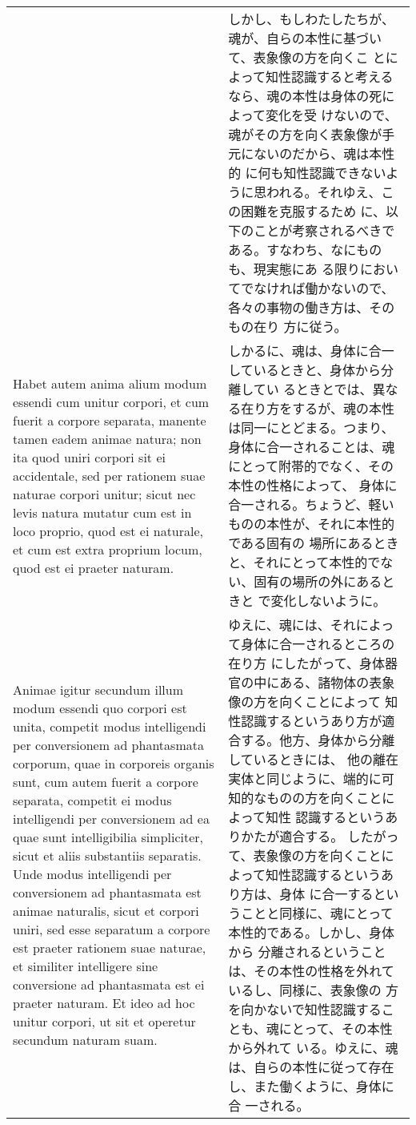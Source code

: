 \documentclass[10pt]{jsarticle} %
\begin{document}
\begin{longtable}{p{21em}p{21em}}
&

しかし、もしわたしたちが、魂が、自らの本性に基づいて、表象像の方を向くこ
 とによって知性認識すると考えるなら、魂の本性は身体の死によって変化を受
 けないので、魂がその方を向く表象像が手元にないのだから、魂は本性的
 に何も知性認識できないように思われる。それゆえ、この困難を克服するため
 に、以下のことが考察されるべきである。すなわち、なにものも、現実態にあ
 る限りにおいてでなければ働かないので、各々の事物の働き方は、そのもの在り
 方に従う。

\\

 Habet autem anima alium modum essendi cum unitur
 corpori, et cum fuerit a corpore separata, manente tamen eadem animae
 natura; non ita quod uniri corpori sit ei accidentale, sed per rationem
 suae naturae corpori unitur; sicut nec levis natura mutatur cum est in
 loco proprio, quod est ei naturale, et cum est extra proprium locum,
 quod est ei praeter naturam.

&

しかるに、魂は、身体に合一しているときと、身体から分離してい
 るときとでは、異なる在り方をするが、魂の本性は同一にとどまる。つまり、
 身体に合一されることは、魂にとって附帯的でなく、その本性の性格によって、
 身体に合一される。ちょうど、軽いものの本性が、それに本性的である固有の
 場所にあるときと、それにとって本性的でない、固有の場所の外にあるときと
 で変化しないように。

\\

Animae igitur secundum illum modum essendi
 quo corpori est unita, competit modus intelligendi per conversionem ad
 phantasmata corporum, quae in corporeis organis sunt, cum autem fuerit
 a corpore separata, competit ei modus intelligendi per conversionem ad
 ea quae sunt intelligibilia simpliciter, sicut et aliis substantiis
 separatis. Unde modus intelligendi per conversionem ad phantasmata est
 animae naturalis, sicut et corpori uniri, sed esse separatum a corpore
 est praeter rationem suae naturae, et similiter intelligere sine
 conversione ad phantasmata est ei praeter naturam. Et ideo ad hoc
 unitur corpori, ut sit et operetur secundum naturam suam. 

&
ゆえに、魂には、それによって身体に合一されるところの在り方
 にしたがって、身体器官の中にある、諸物体の表象像の方を向くことによって
 知性認識するというあり方が適合する。他方、身体から分離しているときには、
 他の離在実体と同じように、端的に可知的なものの方を向くことによって知性
 認識するというありかたが適合する。
したがって、表象像の方を向くことによって知性認識するというあり方は、身体
 に合一するということと同様に、魂にとって本性的である。しかし、身体から
 分離されるということは、その本性の性格を外れているし、同様に、表象像の
 方を向かないで知性認識することも、魂にとって、その本性から外れて
 いる。ゆえに、魂は、自らの本性に従って存在し、また働くように、身体に合
 一される。


\end{longtable}
\end{document}

